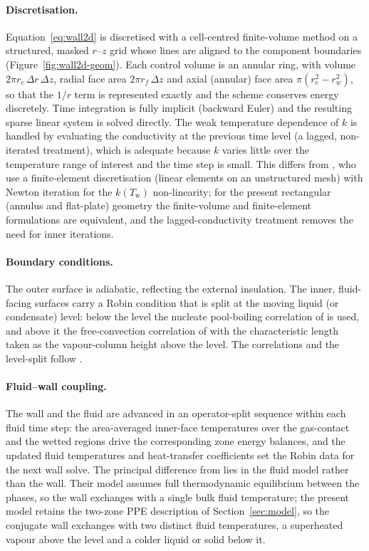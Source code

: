 \documentclass[5p,authoryear]{elsarticle}
\begin{document}
\paragraph{Discretisation.} Equation~\eqref{eq:wall2d} is discretised with a cell-centred
finite-volume method on a structured, masked $r$--$z$ grid whose lines are aligned to the
component boundaries (Figure~\ref{fig:wall2d-geom}). Each control volume is an annular ring, with
volume $2\pi r_c\,\Delta r\,\Delta z$, radial face area $2\pi r_f\,\Delta z$ and axial (annular)
face area $\pi(r_e^2-r_w^2)$, so that the $1/r$ term is represented exactly and the scheme
conserves energy discretely. Time integration is fully implicit (backward Euler) and the resulting
sparse linear system is solved directly. The weak temperature dependence of $k$ is handled by
evaluating the conductivity at the previous time level (a lagged, non-iterated treatment), which is
adequate because $k$ varies little over the temperature range of interest and the time step is
small. This differs from \citet{Hoydalsvik2026}, who use a finite-element discretisation (linear
elements on an unstructured mesh) with Newton iteration for the $k(T_\mathrm{w})$ non-linearity;
for the present rectangular (annulus and flat-plate) geometry the finite-volume and finite-element
formulations are equivalent, and the lagged-conductivity treatment removes the need for inner
iterations.

\paragraph{Boundary conditions.} The outer surface is adiabatic, reflecting the external
insulation. The inner, fluid-facing surfaces carry a Robin condition that is split at the moving
liquid (or condensate) level: below the level the nucleate pool-boiling correlation of
\citet{Cooper1984} is used, and above it the free-convection correlation of \citet{ChurchillChu1975}
with the characteristic length taken as the vapour-column height above the level. The correlations
and the level-split follow \citet{Hoydalsvik2026}.

\paragraph{Fluid--wall coupling.} The wall and the fluid are advanced in an operator-split
sequence within each fluid time step: the area-averaged inner-face temperatures over the
gas-contact and the wetted regions drive the corresponding zone energy balances, and the updated
fluid temperatures and heat-transfer coefficients set the Robin data for the next wall solve. The
principal difference from \citet{Hoydalsvik2026} lies in the fluid model rather than the wall.
Their model assumes full thermodynamic equilibrium between the phases, so the wall exchanges with a
single bulk fluid temperature; the present model retains the two-zone PPE
description of Section~\ref{sec:model}, so the conjugate wall exchanges with two distinct fluid
temperatures, a superheated vapour above the level and a colder liquid or solid below it.
\end{document}
